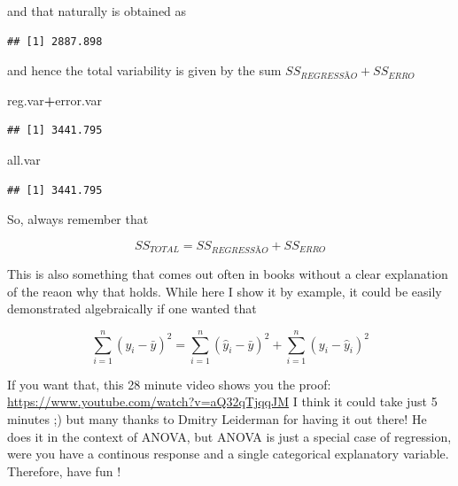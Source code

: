 \documentclass[
]{book}
\newenvironment{Shaded}{\begin{snugshade}}{\end{snugshade}}
\newcommand{\DecValTok}[1]{\textcolor[rgb]{0.00,0.00,0.81}{#1}}
\newcommand{\FunctionTok}[1]{\textcolor[rgb]{0.13,0.29,0.53}{\textbf{#1}}}
\newcommand{\NormalTok}[1]{#1}
\newcommand{\OtherTok}[1]{\textcolor[rgb]{0.56,0.35,0.01}{#1}}
\newcommand{\SpecialCharTok}[1]{\textcolor[rgb]{0.81,0.36,0.00}{\textbf{#1}}}
\begin{document}
and that naturally is obtained as

\begin{Shaded}
\end{Shaded}

\begin{verbatim}
## [1] 2887.898
\end{verbatim}

and hence the total variability is given by the sum \(SS_{REGRESSÃO}+SS_{ERRO}\)

\begin{Shaded}
\begin{Highlighting}[]
\NormalTok{reg.var}\SpecialCharTok{+}\NormalTok{error.var}
\end{Highlighting}
\end{Shaded}

\begin{verbatim}
## [1] 3441.795
\end{verbatim}

\begin{Shaded}
\begin{Highlighting}[]
\NormalTok{all.var}
\end{Highlighting}
\end{Shaded}

\begin{verbatim}
## [1] 3441.795
\end{verbatim}

So, always remember that

\[SS_{TOTAL}=SS_{REGRESSÃO}+SS_{ERRO}\]

This is also something that comes out often in books without a clear explanation of the reaon why that holds. While here I show it by example, it could be easily demonstrated algebraically if one wanted that

\[\sum_{i=1}^n (y_i- \bar y)^2=\sum_{i=1}^n (\hat y_i- \bar y)^2 + \sum_{i=1}^n (y_i- \hat y_i)^2\]

If you want that, this 28 minute video shows you the proof: \url{https://www.youtube.com/watch?v=aQ32qTjqqJM}
I think it could take just 5 minutes ;) but many thanks to Dmitry Leiderman for having it out there! He does it in the context of ANOVA, but ANOVA is just a special case of regression, were you have a continous response and a single categorical explanatory variable. Therefore, have fun !
\end{document}
